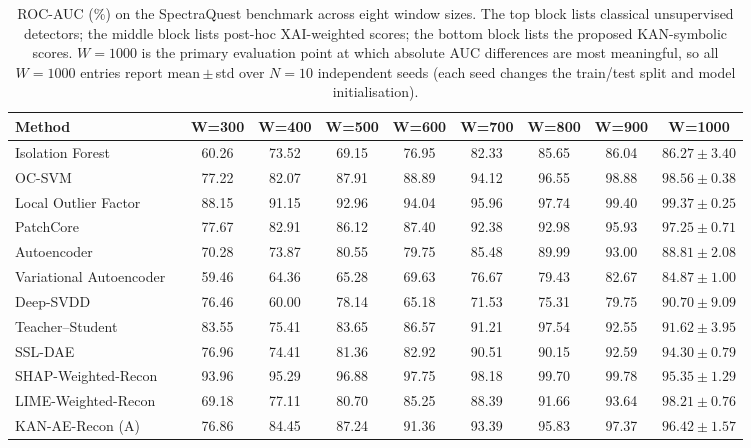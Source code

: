 \documentclass[conference]{IEEEtran}
\begin{document}
\begin{table}[t]
\centering
\caption{ROC-AUC (\%) on the SpectraQuest benchmark across
eight window sizes. The top block lists classical unsupervised
detectors; the middle block lists post-hoc XAI-weighted scores;
the bottom block lists the proposed KAN-symbolic scores.
 $W{=}1000$ is the primary evaluation point at which absolute AUC differences are most meaningful, so all $W{=}1000$ entries report mean\,$\pm$\,std over $N{=}10$
independent seeds (each seed changes the train/test split and
model initialisation).}
\label{tab:bench}
\small
\begin{tabular}{lcccccccc}
\toprule
Method & W=300 & W=400 & W=500 & W=600 & W=700 & W=800 & W=900 & W=1000 \\
\midrule
Isolation Forest ~\cite{IsolationForest}     & 60.26 & 73.52 & 69.15 & 76.95 & 82.33 & 85.65 & 86.04 & $86.27\pm3.40$ \\
OC-SVM  ~\cite{OCSVM}             & 77.22 & 82.07 & 87.91 & 88.89 & 94.12 & 96.55 & 98.88 & $98.56\pm0.38$ \\
Local Outlier Factor     ~\cite{LOF}             & 88.15 & 91.15 & 92.96 & 94.04 & 95.96 & 97.74 & 99.40 & $99.37\pm0.25$ \\
PatchCore    ~\cite{patchcoreref}        & 77.67 & 82.91 & 86.12 & 87.40 & 92.38 & 92.98 & 95.93 & $97.25\pm0.71$ \\
Autoencoder   ~\cite{autoencref}       & 70.28 & 73.87 & 80.55 & 79.75 & 85.48 & 89.99 & 93.00 & $88.81\pm2.08$ \\
Variational Autoencoder       ~\cite{vaeref}           & 59.46 & 64.36 & 65.28 & 69.63 & 76.67 & 79.43 & 82.67 & $84.87\pm1.00$ \\
Deep-SVDD  ~\cite{deeponeclassref}          & 76.46 & 60.00 & 78.14 & 65.18 & 71.53 & 75.31 & 79.75 & $90.70\pm9.09$ \\
Teacher--Student ~\cite{teacherstudent}    & 83.55 & 75.41 & 83.65 & 86.57 & 91.21 & 97.54 & 92.55 & $91.62\pm3.95$ \\
SSL-DAE      ~\cite{ssldaeref}        & 76.96 & 74.41 & 81.36 & 82.92 & 90.51 & 90.15 & 92.59 & $94.30\pm0.79$ \\
\midrule
SHAP-Weighted-Recon ~\cite{shapref}  & 93.96 & 95.29 & 96.88 & 97.75 & 98.18 & 99.70 & 99.78 & $95.35\pm1.29$ \\
LIME-Weighted-Recon ~\cite{LIMEref} & 69.18 & 77.11 & 80.70 & 85.25 & 88.39 & 91.66 & 93.64 & $98.21\pm0.76$ \\
\midrule
KAN-AE-Recon (A)            & 76.86 & 84.45 & 87.24 & 91.36 & 93.39 & 95.83 & 97.37 & $96.42\pm1.57$ \\

\end{tabular}
\end{table}
\end{document}
